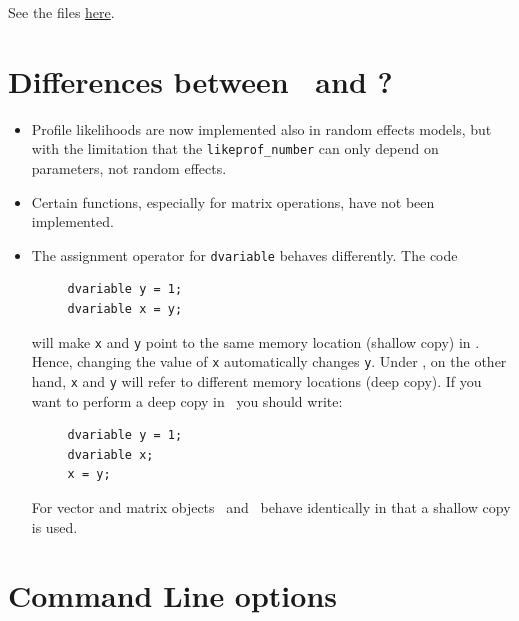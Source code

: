 \documentclass{admbmanual}
\begin{document}
See the files \href{http://admb-project.org/community/tutorials-and-examples/%
random-effects-example-collection/%
item-response-theory-irt-and-the-multilevel-rasch-model-1}{here}.

\chapter{Differences between \scAB\ and \scAR?}

\begin{itemize}
  \item Profile likelihoods are now implemented also in random effects models,
  but with the limitation that the \texttt{likeprof\_number} can only depend on
  parameters, not random effects.
  \item Certain functions, especially for matrix operations, have not been
  implemented.
  \item The assignment operator for \texttt{dvariable} behaves differently. The
  code
\begin{lstlisting}
     dvariable y = 1;
     dvariable x = y;
\end{lstlisting}
  will make \texttt{x} and \texttt{y} point to the same memory location (shallow
  copy) in \scAR. Hence, changing the value of \texttt{x} automatically changes
  \texttt{y}. Under \scAB, on the other hand, \texttt{x} and \texttt{y} will
  refer to different memory locations (deep copy). If you want to perform a deep
  copy in \scAR\ you should write:
\begin{lstlisting}
     dvariable y = 1;
     dvariable x;
     x = y;
\end{lstlisting}
  For vector and matrix objects \scAB\ and \scAR\ behave identically in that
  a shallow copy is used.
\end{itemize}

\chapter{Command Line options}
\label{sec:command_line_options}
\end{document}

